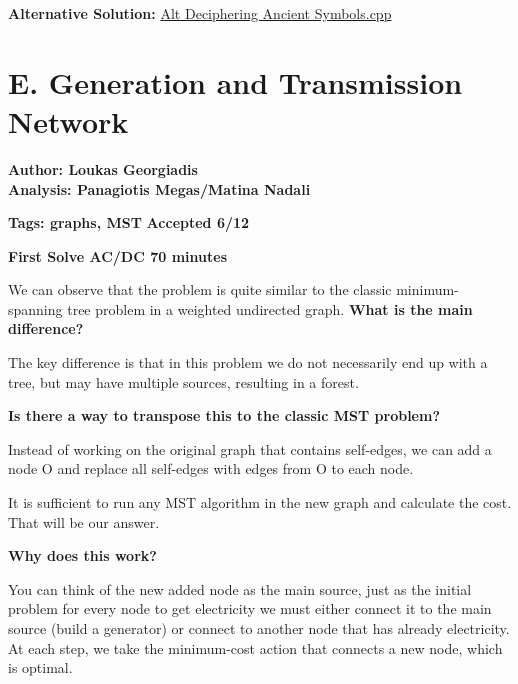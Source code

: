 \documentclass{article}
\begin{document}
\vspace{1em}
\noindent \textbf{Alternative Solution:} 
\href{https://github.com/StathisKons/GRCPC-2024-Editorial-Implementations/blob/main/D.%20Alt%20Sol%20Deciphering%20Ancient%20Symbols.cpp}{Alt Deciphering Ancient Symbols.cpp}

\newpage

\vspace{5em}

\section*{E. Generation and Transmission Network}

\textbf{Author: Loukas Georgiadis}\\
\textbf{Analysis: Panagiotis Megas/Matina Nadali}

\vspace{2em}
\noindent \textbf{Tags: graphs, MST} 
\hfill \textbf{Accepted 6/12}

\hfill \textbf{First Solve AC/DC 70 minutes}

\vspace{2em}

\noindent We can observe that the problem is quite similar to the classic minimum-spanning tree problem in a weighted undirected graph.  \textbf{What is the main difference?}

\noindent The key difference is that in this problem we do not necessarily end up with a tree, but may have multiple sources, resulting in a forest. 

\vspace{1em}

\noindent \textbf{Is there a way to transpose this to the classic MST problem?}

\noindent Instead of working on the original graph that contains self-edges, we can add a node O and replace all self-edges with edges from O to each node. 

\vspace{1em}
\noindent It is sufficient to run any MST algorithm in the new graph and calculate the cost. That will be our answer. 

\vspace{1em}
\noindent \textbf{Why does this work?}

\noindent You can think of the new added node as the main source, just as the initial problem for every node to get electricity  we must either connect it to the main source (build a generator) or connect to another node that has already electricity. At each step, we take the minimum-cost action that connects a new node, which is optimal.
\end{document}
